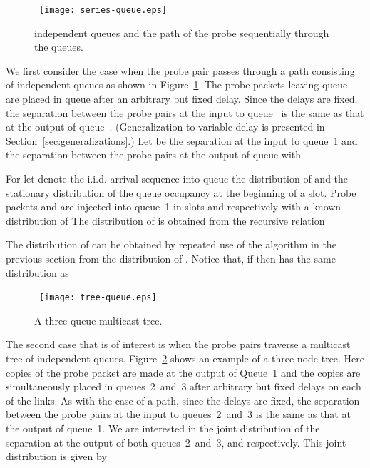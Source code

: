 \documentclass[11pt]{article}
\begin{document}
\begin{figure}
  \begin{center}
    \     
    \texttt{[image: series-queue.eps]}
  \end{center}
  \caption{ independent queues and the path of the probe
    sequentially through the  queues.}
    \label{fig:queue-series}
\end{figure}

We first consider the case when the probe pair passes through a path
consisting of  independent queues as shown in
Figure~\ref{fig:queue-series}. The probe packets leaving queue~ are
placed in queue  after an arbitrary but fixed delay. Since the
delays are fixed, the separation between the probe pairs at the input
to queue~ is the same as that at the output of queue~.
(Generalization to variable delay is presented in
Section~\ref{sec:generalizations}.)  Let  be the separation at
the input to queue~1 and  the separation between the probe pairs
at the output of queue  with 

For  let  denote the i.i.d.  arrival
sequence into queue   the distribution of 
and  the stationary distribution of the queue occupancy
at the beginning of a slot.  Probe packets  and  are
injected into queue~1 in slots  and  respectively with a known
distribution of  The distribution of  is obtained from the
recursive relation

The distribution of  can be obtained by repeated use of the
algorithm in the previous section from the distribution of .
Notice that, if  then  has the same distribution as


\begin{figure}
  \begin{center}
    \ 
    \texttt{[image: tree-queue.eps]}
  \end{center}
    \caption{A three-queue multicast tree.}
    \label{fig:queue-tree}
\end{figure}


The second case that is of interest is when the probe pairs traverse a
multicast tree of independent queues. Figure~\ref{fig:queue-tree}
shows an example of a three-node tree. Here copies of the probe packet
are made at the output of Queue~1 and the copies are simultaneously
placed in queues~2~and~3 after arbitrary but fixed delays on each of
the links. As with the case of a path, since the delays are fixed, the
separation between the probe pairs at the input to queues~2~and~3 is
the same as that at the output of queue~1. We are interested in the
joint distribution of the separation at the output of both
queues~2~and~3,  and  respectively. This joint distribution
is given by
\end{document}
